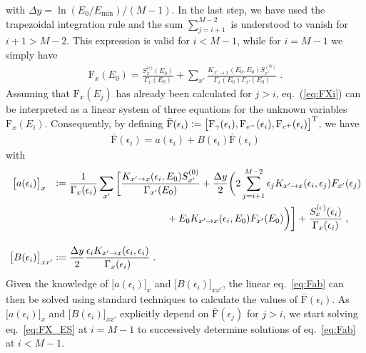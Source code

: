 \documentclass[11pt,a4paper]{article}
\newcommand{\Fpdi}{\mathrm{F}}
\newcommand{\eqsp}{\;}
\newcommand{\X}{x}
\newcommand{\ldefine}{\vcentcolon=}
\begin{document}
with $\Delta y = \ln(E_0/E_\text{min})/(M-1)$. In the last step, we have used the trapezoidal integration rule and the sum $\sum_{j=i+1}^{M-2}$ is understood to vanish for $i +1 > M - 2$. This expression is valid for $i < M -1$, while for $i=M-1$ we simply have
\begin{align}
\Fpdi_\X(E_0) = \frac{S_\X^{\text{(c)}}(E_0)}{\Gamma_\X(E_0)} + \sum_{\X'} \frac{K_{\X' \to \X} (E_0, E_0) S_{\X'}^{(0)}}{\Gamma_\X(E_0) \Gamma_{\X'} (E_0)}\eqsp.
\label{eq:FX_ES}
\end{align}
Assuming that $\Fpdi_\X(E_j)$ has already been calculated for $j>i$, eq.~(\ref{eq:FXi}) can be interpreted as a linear system of three equations for the unknown variables $\Fpdi_\X(E_i)$. Consequently, by defining $\bar{\Fpdi}(\epsilon_i) \ldefine \big[ \Fpdi_\gamma(\epsilon_i), \Fpdi_{e^-}(\epsilon_i), \Fpdi_{e^+}(\epsilon_i)\big]^\text{T}$, we have
\begin{align}
\bar{\Fpdi}(\epsilon_i) = a(\epsilon_i) + B(\epsilon_i) \bar{\Fpdi}(\epsilon_i)
\label{eq:Fab}
\end{align}
with
\begin{align}
\big[ a(\epsilon_i) \big]_{\X\hphantom{\X'}} & \ldefine \frac{1}{\Gamma_\X(\epsilon_i)} \sum_{\X'} \bigg[ \frac{K_{\X' \to \X} (\epsilon_i, E_0) S_{\X'}^{(0)}}{\Gamma_{\X'} (E_0)} + \frac{\Delta y}{2} \bigg( 2 \sum_{j=i+1}^{M-2} \epsilon_j K_{\X' \to \X} (\epsilon_i, \epsilon_j) F_{\X'}(\epsilon_j)\nonumber\\
& \hspace{4cm} + E_0 K_{\X' \to \X} (\epsilon_i, E_0) F_{\X'}(E_0) \bigg) \bigg] + \frac{S_\X^{\text{(c)}}(\epsilon_i)}{\Gamma_\X(\epsilon_i)}\eqsp, \\[4mm]
\big[B(\epsilon_i)\big]_{\X \X'} & \ldefine \frac{\Delta y}{2} \frac{\epsilon_i K_{\X' \to \X} (\epsilon_i, \epsilon_i)}{\Gamma_\X(\epsilon_i)}\eqsp.
\end{align}
Given the knowledge of $\big[ a(\epsilon_i) \big]_{\X}$ and $\big[B(\epsilon_i)\big]_{\X \X'}$, the linear eq.~\eqref{eq:Fab} can then be solved using standard techniques to calculate the values of $\bar{\Fpdi}(\epsilon_i)$.
As $\big[ a(\epsilon_i) \big]_{\X}$ and $\big[B(\epsilon_i)\big]_{\X \X'}$ explicitly depend on $\bar{\Fpdi}(\epsilon_j)$ for $j > i$, we start solving eq.~\eqref{eq:FX_ES} at $i=M-1$ to successively determine solutions of eq.~\eqref{eq:Fab} at $i < M-1$.
\end{document}
